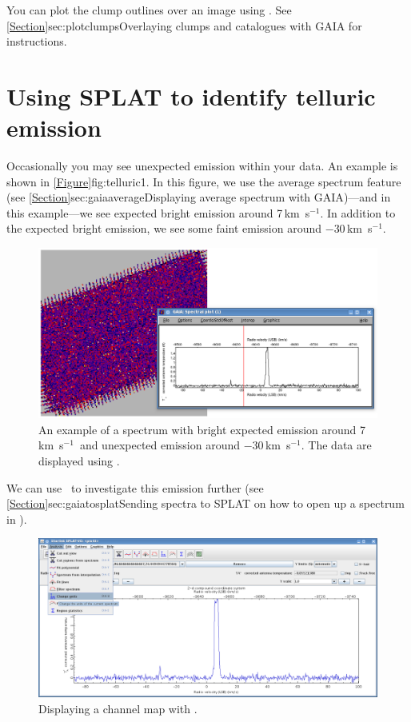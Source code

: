 \documentclass[11pt,oneside,chapters]{starlink}
\newcommand{\kms}{\mbox{$\,$km~s$^{-1}$}}   %
\newcommand{\kms}{\,km~s$^{-1}$}   %
\begin{document}
You can plot the clump outlines over an image using \gaia. See
\cref{Section}{sec:plotclumps}{Overlaying clumps and catalogues with
GAIA} for instructions.


\section{Using SPLAT to identify telluric emission}
\label{sec:telluricsplat}

Occasionally you may see unexpected emission within your data. An
example is shown in \cref{Figure}{fig:telluric1}{}. In this figure, we
use the average spectrum feature (see
\cref{Section}{sec:gaiaaverage}{Displaying average spectrum with
GAIA})---and in this example---we see expected bright emission around
7\kms. In addition to the expected bright emission, we see some faint
emission around $-$30\kms.

\begin{figure}[h!]
\begin{center}
\includegraphics[width=0.7\linewidth]{sc20_splat_spectrum_example_telluric1.png}
\caption[An example of unexpected emission seen in \gaia.]{\label{fig:telluric1}
  An example of a spectrum with bright expected emission around 7\kms\ and
  unexpected emission around $-$30\kms. The data are displayed using \gaia.}
\end{center}
\end{figure}

We can use \splat\ to investigate this emission further (see
\cref{Section}{sec:gaiatosplat}{Sending spectra to SPLAT} on how to
open up a spectrum in \splat).

\begin{figure}[h!]
\begin{center}
\includegraphics[width=0.7\linewidth]{sc20_splat_spectrum_example_telluric2.png}
\caption[blah]{\label{fig:telluric2}
  Displaying a channel map with \splat.}
\end{center}
\end{figure}
\end{document}
